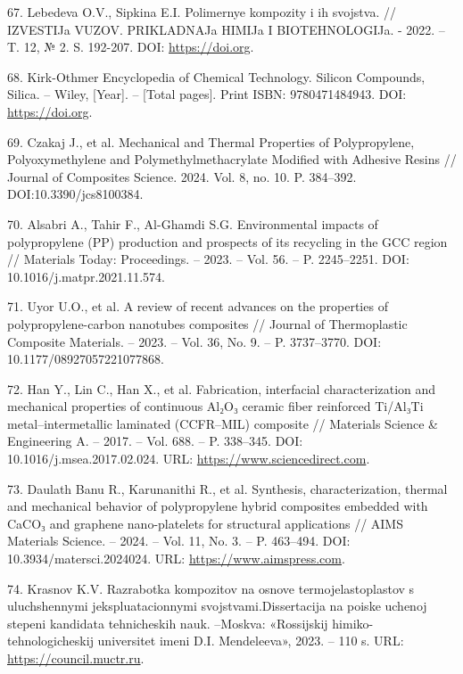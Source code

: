 \begin{references}
67. Lebedeva O.V., Sipkina E.I. Polimernye kompozity i ih svojstva. //
IZVESTIJa VUZOV. PRIKLAD\-NAJa HIMIJa I BIOTEHNOLOGIJa. - 2022. – T. 12,
№
2. S. 192-207. DOI: \href{https://doi.org/10.21285/2227-2925-2022-12-2-192-207}{https://doi.org}.

68. Kirk-Othmer Encyclopedia of Chemical Technology. Silicon
Compounds, Silica. – Wiley, [Year]. – [Total pages]. Print ISBN:
9780471484943. DOI: \href{https://doi.org/10.1002/0471238961}{https://doi.org}.

69. Czakaj J., et al. Mechanical and Thermal Properties of
Polypropylene, Polyoxymethylene and Polymeth\-ylmethacrylate Modified
with Adhesive Resins // Journal of Composites Science. 2024. Vol. 8,
no. 10. P. 384–392. DOI:10.3390/jcs8100384.

70. Alsabri A., Tahir F., Al-Ghamdi S.G. Environmental impacts of
polypropylene (PP) production and prospects of its recycling in the
GCC region // Materials Today: Proceedings. – 2023. – Vol. 56. –
P. 2245–2251. DOI: 10.1016/j.matpr.2021.11.574.

71. Uyor U.O., et al. A review of recent advances on the properties of
polypropylene-carbon nanotubes composites // Journal of Thermoplastic
Composite Materials. – 2023. – Vol. 36, No. 9. – P. 3737–3770. DOI:
10.1177/08927057221077868.

72. Han Y., Lin C., Han X., et al. Fabrication, interfacial
characterization and mechanical properties of continuous Al₂O₃ ceramic
fiber reinforced Ti/Al₃Ti metal–intermetallic laminated (CCFR–MIL)
composite // Materials Science \& Engineering A. – 2017. – Vol. 688. –
P. 338–345. DOI: 10.1016/j.msea.2017.02.024.
URL: \href{https://www.sciencedirect.com/science/article/abs/pii/S0921509317302024}{https://www.sciencedirect.com}.

73. Daulath Banu R., Karunanithi R., et al. Synthesis,
characterization, thermal and mechanical behavior of polypropylene
hybrid composites embedded with CaCO₃ and graphene nano-platelets for
structural applications // AIMS Materials Science. – 2024. – Vol. 11,
No. 3. – P. 463–494. DOI: \\10.3934/matersci.2024024.
URL: \href{https://www.aimspress.com/article/id/662b8640ba35de0a25643462}{https://www.aimspress.com}.

74. Krasnov K.V. Razrabotka kompozitov na osnove termojelastoplastov s
uluchshennymi jekspluatacion\-nymi svojstvami.Dissertacija na poiske
uchenoj stepeni kandidata tehnicheskih nauk. –Moskva: «Rossijskij
himiko-tehnologicheskij universitet imeni D.I. Mendeleeva», 2023. –
110
s. URL: \href{https://council.muctr.ru/media/CandidateCase/a9f669f0-fca4-432b-b67a-486bc3249d8c/c1127708-3fd5-4193-914b-954ad3d04239.pdf?utm_source}{https://council.muctr.ru}.


\end{references}
